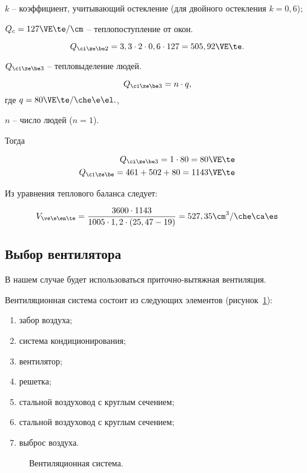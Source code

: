 $k$ -- коэффициент, учитывающий остекление (для двойного остекления $k = 0,6$);

$Q_c = 127 \VE\te / \cm$ -- теплопоступление от окон.

\begin{equation*}
	Q_{\ci\ze\be2} = 3,3 \cdot 2 \cdot 0,6 \cdot 127 = 505,92 \VE\te.
\end{equation*}

$Q_{\ci\ze\be3}$ -- тепловыделение людей.

\begin{equation*}
	Q_{\ci\ze\be3} = n \cdot q,
\end{equation*}
где $q = 80 \VE\te / \che\e\el.$,

$n$ -- число людей ($n = 1$).

Тогда

\begin{eqnarray*}
	Q_{\ci\ze\be3} = 1 \cdot 80 = 80 \VE\te \\
	Q_{\ci\ze\be} = 461 + 502 + 80 = 1143 \VE\te
\end{eqnarray*}

Из уравнения теплового баланса следует:

\begin{equation*}
	V_{\ve\e\en\te} = \frac{3600 \cdot 1143}{1005 \cdot 1,2 \cdot (25,47 - 19)} = 527,35 \cm^3 / \che\ca\es
\end{equation*}

\subsection{Выбор вентилятора}
В нашем случае будет использоваться приточно-вытяжная вентиляция.

Вентиляционная система состоит из следующих элементов (рисунок~\ref{img:ventilation}): 
\begin{enumerate}
	\item забор воздуха;
	\item система кондиционирования;
	\item вентилятор;
	\item решетка;
	\item стальной воздуховод с круглым сечением;
	\item стальной воздуховод с круглым сечением;
	\item выброс воздуха.
\end{enumerate}

\begin{figure}[H]
    \caption{Вентиляционная система.}
    \label{img:ventilation}
\end{figure}

